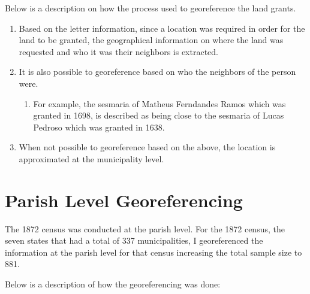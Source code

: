 \documentclass[11pt]{article}
\begin{document}
Below is a description on how the process used to georeference the land grants.

\begin{enumerate}
  \item Based on the letter information, since a location was required in order for the land to be granted, the geographical information on where the land was requested and who it was their neighbors is extracted.
  \item It is also possible to georeference based on who the neighbors of the person were. 
  \begin{enumerate}
    \item For example, the sesmaria of Matheus Ferndandes Ramos which was granted in 1698, is described as being close to the sesmaria of Lucas Pedroso which was granted in 1638. 
  \end{enumerate}
  \item When not possible to georeference based on the above, the location is approximated at the municipality level. 
\end{enumerate}


\clearpage

\section{Parish Level Georeferencing}
\label{app:georeferencing_parishes}

The 1872 census was conducted at the parish level. For the 1872 census, the seven states that had a total of 337 municipalities, I georeferenced the information at the parish level for that census increasing the total sample size to 881.

Below is a description of how the georeferencing was done:
\end{document}
